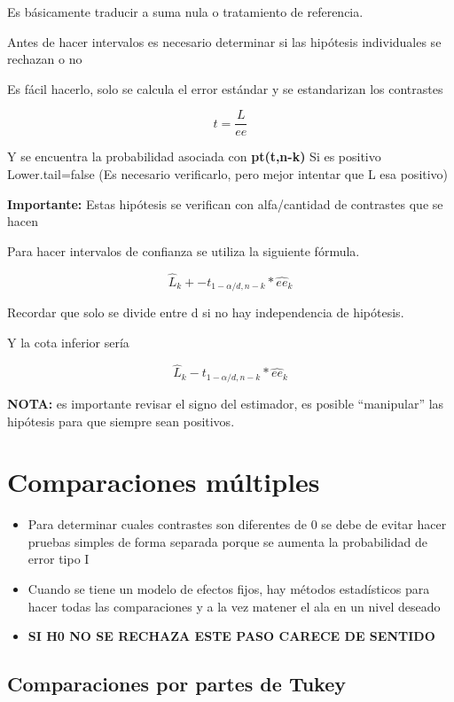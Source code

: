 \documentclass[
]{article}
\begin{document}
Es básicamente traducir a suma nula o tratamiento de referencia.

Antes de hacer intervalos es necesario determinar si las hipótesis
individuales se rechazan o no

Es fácil hacerlo, solo se calcula el error estándar y se estandarizan
los contrastes

\[
t=\frac{L}{ee}
\]

Y se encuentra la probabilidad asociada con \textbf{pt(t,n-k)} Si es
positivo Lower.tail=false (Es necesario verificarlo, pero mejor intentar
que L esa positivo)

\textbf{Importante:} Estas hipótesis se verifican con alfa/cantidad de
contrastes que se hacen

Para hacer intervalos de confianza se utiliza la siguiente fórmula.

\[
\hat L _k+-t_{1-\alpha/d,n-k}*\hat {ee}_k
\]

Recordar que solo se divide entre d si no hay independencia de
hipótesis.

Y la cota inferior sería

\[
\hat L _k-t_{1-\alpha/d,n-k}*\hat {ee}_k
\]

\textbf{NOTA:} es importante revisar el signo del estimador, es posible
``manipular'' las hipótesis para que siempre sean positivos.

\section{Comparaciones múltiples}\label{comparaciones-muxfaltiples}

\begin{itemize}
\item
  Para determinar cuales contrastes son diferentes de 0 se debe de
  evitar hacer pruebas simples de forma separada porque se aumenta la
  probabilidad de error tipo I
\item
  Cuando se tiene un modelo de efectos fijos, hay métodos estadísticos
  para hacer todas las comparaciones y a la vez matener el ala en un
  nivel deseado
\item
  \textbf{SI H0 NO SE RECHAZA ESTE PASO CARECE DE SENTIDO}
\end{itemize}

\subsection{Comparaciones por partes de
Tukey}\label{comparaciones-por-partes-de-tukey}
\end{document}
